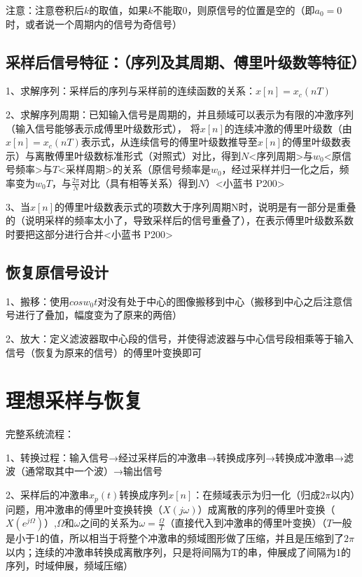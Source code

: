 注意：注意卷积后$k$的取值，如果$k$不能取0，则原信号的位置是空的（即$a_0=0$时，或者说一个周期内的信号为奇信号）



\subsection{采样后信号特征：（序列及其周期、傅里叶级数等特征）}

1、求解序列：采样后的序列与采样前的连续函数的关系：$x[n]=x_c(nT)$

2、求解序列周期：已知输入信号是周期的，并且频域可以表示为有限的冲激序列（输入信号能够表示成傅里叶级数形式）， 将$x[n]$的连续冲激的傅里叶级数（由$x[n]=x_c(nT)$表示式，从连续信号的傅里叶级数推导至$x[n]$的傅里叶级数表示）与离散傅里叶级数标准形式（对照式）对比，得到$N$<序列周期>与$w_0$<原信号频率>与$T$<采样周期>的关系（原信号频率是$w_0$，经过采样并归一化之后，频率变为$w_0T$，与$\frac{2\pi}{N}$对比（具有相等关系）得到$N$）<小蓝书 P200>

3、当$x[n]$的傅里叶级数表示式的项数大于序列周期N时，说明是有一部分是重叠的（说明采样的频率太小了，导致采样后的信号重叠了），在表示傅里叶级数系数时要把这部分进行合并<小蓝书 P200>



\subsection{恢复原信号设计}

1、搬移：使用$cosw_0t$对没有处于中心的图像搬移到中心（搬移到中心之后注意信号进行了叠加，幅度变为了原来的两倍）

2、放大：定义滤波器取中心段的信号，并使得滤波器与中心信号段相乘等于输入信号（恢复为原来的信号）的傅里叶变换即可

\section{理想采样与恢复}

完整系统流程：

1、转换过程：输入信号→经过采样后的冲激串→转换成序列→转换成冲激串→滤波（通常取其中一个波）→输出信号

2、采样后的冲激串$x_p(t)$转换成序列$x[n]$：在频域表示为归一化（归成$2\pi$以内）问题，用冲激串的傅里叶变换转换（$X(j\omega)$）成离散的序列的傅里叶变换（$X(e^{j\Omega})$）,$\Omega$和$\omega$之间的关系为$\omega = \frac {\Omega}{T}$（直接代入到冲激串的傅里叶变换）（$T$一般是小于1的值，所以相当于将整个冲激串的频域图形做了压缩，并且是压缩到了$2\pi$以内；连续的冲激串转换成离散序列，只是将间隔为T的串，伸展成了间隔为1的序列，时域伸展，频域压缩）

